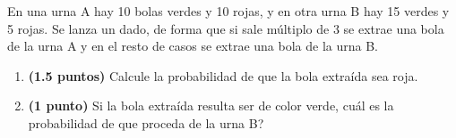 
En una urna A hay 10 bolas verdes y 10 rojas, y en otra urna B hay 15 verdes y 5 rojas. Se lanza un dado, de forma que si sale múltiplo de 3 se extrae una bola de la urna A y en el resto de casos se extrae una bola de la urna B.
\begin{enumerate}[label=\alph*)]
\item \textbf{(1.5 puntos)} Calcule la probabilidad de que la bola extraída sea roja.
\item \textbf{(1 punto)} Si la bola extraída resulta ser de color verde, \textquestiondown{}cuál es la probabilidad de que proceda de la urna B?
\end{enumerate}
